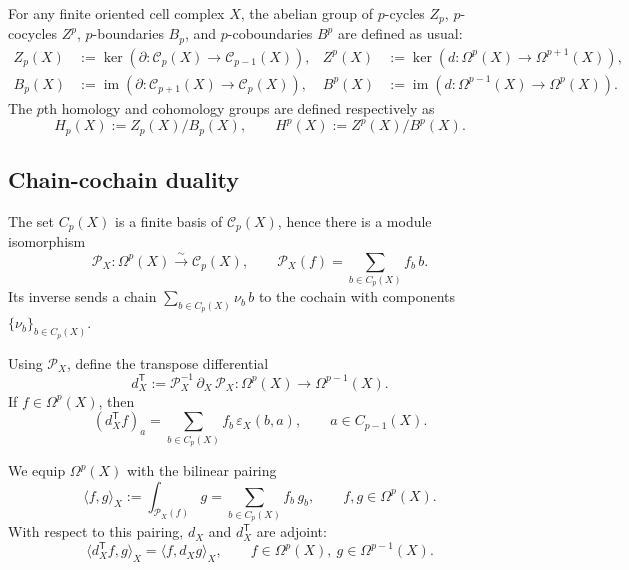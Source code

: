 \documentclass[dvipsnames,a4paper]{article}
\numberwithin{equation}{section}
\theoremstyle{definition}
\theoremstyle{remark}
\begin{document}
For any finite oriented cell complex \(X\), the abelian group of $p$-cycles $Z_p$, $p$-cocycles $Z^p$, $p$-boundaries $B_p$, and $p$-coboundaries $B^p$ are defined as usual:
\begin{align}
	Z_p(X)
	&:=
	\ker \left(\partial:\mathcal C_p(X)\to \mathcal C_{p-1}(X)\right),
	&
	Z^p(X)
	&:=
	\ker \left(d:\Omega^p(X)\to \Omega^{p+1}(X)\right),
	\nonumber\\
	B_p(X)
	&:=
	\operatorname{im} \left(\partial:\mathcal C_{p+1}(X)\to \mathcal C_p(X)\right),
	&
	B^p(X)
	&:=
	\operatorname{im} \left(d:\Omega^{p-1}(X)\to \Omega^p(X)\right).
	\label{eq:ZB}
\end{align}
The $p$th homology and cohomology groups are defined respectively as
\begin{equation}
	H_p(X):=Z_p(X)/B_p(X),
	\qquad
	H^p(X):=Z^p(X)/B^p(X).
	\label{eq:cohomology}
\end{equation}

\subsection{Chain-cochain duality}

The set \(C_p(X)\) is a finite basis of
\(\mathcal C_p(X)\), hence there is a module isomorphism
\begin{equation}
	\mathcal P_X:\Omega^p(X)\xrightarrow{\sim}\mathcal C_p(X),
	\qquad
	\mathcal P_X(f)=\sum_{b\in C_p(X)} f_b\,b.
	\label{eq:PX}
\end{equation}
Its inverse sends a chain \(\sum_{b\in C_p(X)}\nu_b\,b\) to the cochain with components
\(\{\nu_b\}_{b\in C_p(X)}\).

Using \(\mathcal P_X\), define the transpose differential
\begin{equation}
	d_X^{\mathsf T}
	:=
	\mathcal P_X^{-1}\,\partial_X\,\mathcal P_X
	:
	\Omega^p(X)\to \Omega^{p-1}(X).
	\label{eq:dT-def}
\end{equation}
If \(f\in \Omega^p(X)\), then
\begin{equation}
	(d_X^{\mathsf T}f)_a
	=
	\sum_{b\in C_p(X)} f_b\,\varepsilon_X(b,a),
	\qquad
	a\in C_{p-1}(X).
	\label{eq:dT-components}
\end{equation}

We equip \(\Omega^p(X)\) with the bilinear pairing
\begin{equation}
	\langle f,g\rangle_X
	:=
	\int_{\mathcal P_X(f)} g
	=
	\sum_{b\in C_p(X)} f_b\,g_b,
	\qquad
	f,g\in \Omega^p(X).
	\label{eq:bilinear-pairing}
\end{equation}
With respect to this pairing, \(d_X\) and \(d_X^{\mathsf T}\) are adjoint:
\begin{equation}
	\langle d_X^{\mathsf T}f,g\rangle_X
	=
	\langle f,d_X g\rangle_X,
	\qquad
	f\in \Omega^p(X),\ g\in \Omega^{p-1}(X).
	\label{eq:adjoint-d-dT}
\end{equation}
\end{document}
